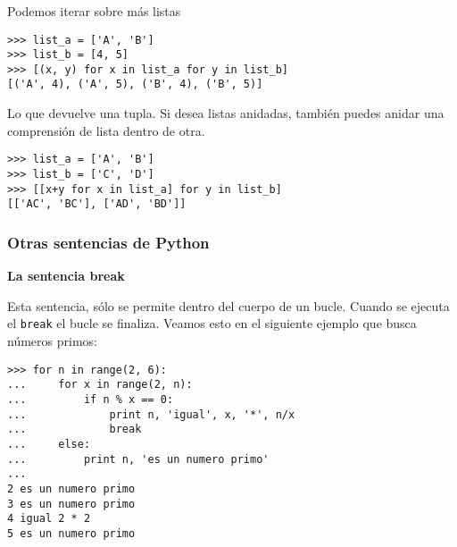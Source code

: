 \documentclass[10pt]{beamer}
\begin{document}
\begin{frame}[fragile]
\frametitle{}

Podemos iterar sobre m\'as listas

\vspace{0.2cm}

\begin{lstlisting}
>>> list_a = ['A', 'B']
>>> list_b = [4, 5]
>>> [(x, y) for x in list_a for y in list_b]
[('A', 4), ('A', 5), ('B', 4), ('B', 5)]
\end{lstlisting}

\vspace{0.2cm}

Lo que devuelve una  tupla. Si desea listas anidadas, tambi\'en puedes anidar una comprensi\'on de lista dentro de otra.

\vspace{0.2cm}

\begin{lstlisting}
>>> list_a = ['A', 'B']
>>> list_b = ['C', 'D']
>>> [[x+y for x in list_a] for y in list_b]
[['AC', 'BC'], ['AD', 'BD']]
\end{lstlisting}
\end{frame}

\begin{frame}[fragile]
\frametitle{Otras sentencias de Python}

\textbf{La sentencia break}

\vspace{0.2cm}

Esta sentencia, s\'olo se permite dentro del cuerpo de un bucle. Cuando se ejecuta el \texttt{break} el bucle se finaliza. Veamos esto  en el siguiente ejemplo que busca n\'umeros primos:

\vspace{0.2cm}

\begin{lstlisting}
>>> for n in range(2, 6):
...     for x in range(2, n):
...         if n % x == 0:
...             print n, 'igual', x, '*', n/x
...             break
...     else:
...         print n, 'es un numero primo'
...
2 es un numero primo
3 es un numero primo
4 igual 2 * 2
5 es un numero primo
\end{lstlisting}

\end{frame}
\end{document}
